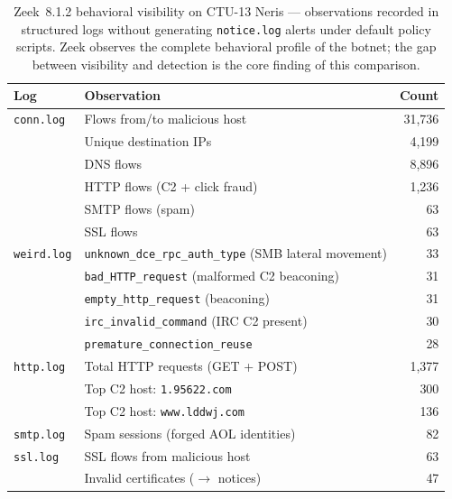 \documentclass[11pt,a4paper]{article}
\begin{document}
    \begin{table}[h]
        \centering
        \caption{Zeek~8.1.2 behavioral visibility on CTU-13 Neris --- observations
        recorded in structured logs without generating \texttt{notice.log} alerts
        under default policy scripts. Zeek observes the complete behavioral
        profile of the botnet; the gap between visibility and detection is the
        core finding of this comparison.}
        \label{tab:zeek_visibility}
        \begin{tabular}{llr}
            \toprule
            \textbf{Log} & \textbf{Observation} & \textbf{Count} \\
            \midrule
            \texttt{conn.log}
            & Flows from/to malicious host       & 31,736 \\
            & Unique destination IPs              & 4,199  \\
            & DNS flows                           & 8,896  \\
            & HTTP flows (C2 + click fraud)       & 1,236  \\
            & SMTP flows (spam)                   & 63     \\
            & SSL flows                           & 63     \\
            \midrule
            \texttt{weird.log}
            & \texttt{unknown\_dce\_rpc\_auth\_type} (SMB lateral movement) & 33 \\
            & \texttt{bad\_HTTP\_request} (malformed C2 beaconing)          & 31 \\
            & \texttt{empty\_http\_request} (beaconing)                     & 31 \\
            & \texttt{irc\_invalid\_command} (IRC C2 present)               & 30 \\
            & \texttt{premature\_connection\_reuse}                          & 28 \\
            \midrule
            \texttt{http.log}
            & Total HTTP requests (GET + POST)    & 1,377 \\
            & Top C2 host: \texttt{1.95622.com}   & 300   \\
            & Top C2 host: \texttt{www.lddwj.com} & 136   \\
            \midrule
            \texttt{smtp.log}
            & Spam sessions (forged AOL identities) & 82 \\
            \midrule
            \texttt{ssl.log}
            & SSL flows from malicious host       & 63 \\
            & Invalid certificates ($\to$ notices) & 47 \\
            \bottomrule
        \end{tabular}
    \end{table}
\end{document}
